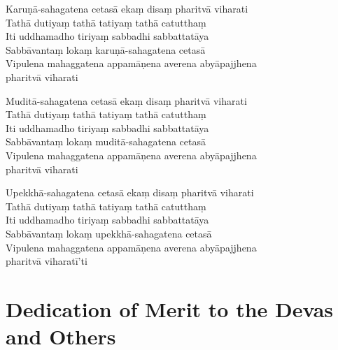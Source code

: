 Karuṇā-sahagatena cetasā ekaṃ disaṃ pharitvā viharati\\
Tathā dutiyaṃ tathā tatiyaṃ tathā catutthaṃ\\
Iti uddhamadho tiriyaṃ sabbadhi sabbattatāya\\
Sabbāvantaṃ lokaṃ karuṇā-sahagatena cetasā\\
Vipulena mahaggatena appamāṇena averena abyāpajjhena\\
\vin pharitvā viharati

Muditā-sahagatena cetasā ekaṃ disaṃ pharitvā viharati\\
Tathā dutiyaṃ tathā tatiyaṃ tathā catutthaṃ\\
Iti uddhamadho tiriyaṃ sabbadhi sabbattatāya\\
Sabbāvantaṃ lokaṃ muditā-sahagatena cetasā\\
Vipulena mahaggatena appamāṇena averena abyāpajjhena\\
\vin pharitvā viharati

Upekkhā-sahagatena cetasā ekaṃ disaṃ pharitvā viharati\\
Tathā dutiyaṃ tathā tatiyaṃ tathā catutthaṃ\\
Iti uddhamadho tiriyaṃ sabbadhi sabbattatāya\\
Sabbāvantaṃ lokaṃ upekkhā-sahagatena cetasā\\
Vipulena mahaggatena appamāṇena averena abyāpajjhena\\
\vin pharitvā viharatī'ti



\section{Dedication of Merit to the Devas and Others}


\begin{leader}
\end{leader}


\enlargethispage{\baselineskip}


